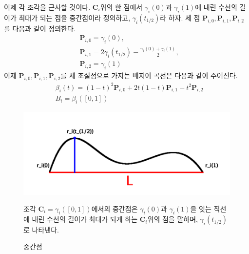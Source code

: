 \documentclass{gshs_thesis}
\theoremstyle{theorem}
\theoremstyle{lemma}
\theoremstyle{definition}
\begin{document}
이제 각 조각을 근사할 것이다.
 $\textbf{C}_{i}$위의 한 점에서 $\gamma_{i}(0)$과 $\gamma_{i}(1)$에 내린 수선의 길이가 최대가 되는 점을 중간점이라 정의하고, $\gamma_{i}(t_{1/2})$라 하자. 세 점 $\textbf{P}_{i,0},\textbf{P}_{i,1},\textbf{P}_{i,2}$ 를 다음과 같이 정의한다. 
\begin{equation}
	\begin{split}
	&\textbf{P}_{i,0}=\gamma_{i}(0), \\
	&\textbf{P}_{i,1}=2\gamma_{i}(t_{1/2})-\frac{\gamma_{i}(0)+\gamma_{i}(1)}{2}, \\
	&\textbf{P}_{i,2}=\gamma_{i}(1)
	\end{split}
\end{equation}
이제 $\textbf{P}_{i,0},\textbf{P}_{i,1},\textbf{P}_{i,2}$를 세 조절점으로 가지는 베지어 곡선은 다음과 같이 주어진다.
\begin{equation}
	\begin{split}
		&\beta_{i}(t)=(1-t)^{2}\textbf{P}_{i,0}+2t(1-t)\textbf{P}_{i,1}+t^{2}\textbf{P}_{i,2} \\
		&B_{i}=\beta_{i}([0,1])
	\end{split}
\end{equation}
\begin{figure}[h]
	\centering
	\includegraphics[width=.9\textwidth]{image/BCmiddlepoint}
	\caption{중간점}
	\raggedright
	\small 조각 $\textbf{C}_{i}=\gamma_{i}([0,1])$에서의 중간점은 $\gamma_{i}(0)$과 $\gamma_{i}(1)$을 잇는 직선에 내린 수선의 길이가 최대가 되게 하는  $\textbf{C}_{i}$위의 점을 말하며, $\gamma_{i}(t_{1/2})$로 나타낸다. 
\end{figure}
\end{document}
